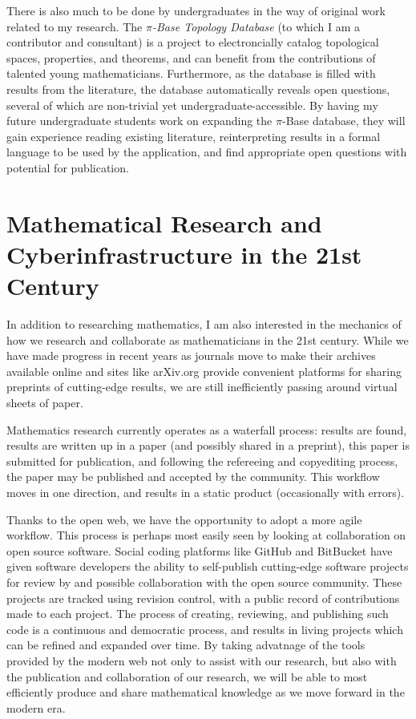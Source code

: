 \documentclass[11pt]{amsart}
\theoremstyle{plain}
\newcommand{\<}{\langle}
\renewcommand{\>}{\rangle}
\begin{document}
There is also much to be done by undergraduates in the way of original work
related to my research. The \textit{$\pi$-Base Topology Database}
(to which I am a contributor and consultant) is a project to electroncially
catalog topological spaces, properties, and theorems, and
can benefit from the contributions of talented young mathematicians.
Furthermore, as the database is filled with results from the literature,
the database automatically reveals open questions, several of which
are non-trivial yet undergraduate-accessible. By having my future
undergraduate students
work on expanding the $\pi$-Base database, they will gain experience reading
existing literature, reinterpreting results in a formal language to be
used by the application, and find appropriate open questions with potential
for publication.


\section*{Mathematical Research and Cyberinfrastructure in the 21st Century}

In addition to researching mathematics, I am also interested in the mechanics
of how we research and collaborate as mathematicians in the 21st century.
While we have made progress in recent years as journals move to make their
archives available online and sites like arXiv.org provide convenient platforms
for sharing preprints of cutting-edge results, we are still
inefficiently passing around virtual sheets of paper.

Mathematics research currently operates as a waterfall process: results
are found, results are written up in a paper (and possibly shared in a
preprint), this paper is submitted for publication, and following the refereeing
and copyediting process, the paper may be published and accepted by the
community. This workflow moves in one direction, and results in a static
product (occasionally with errors).

Thanks to the open web, we have the opportunity to adopt a more agile
workflow. This process is perhaps most
easily seen by looking at collaboration on open source software.
Social coding platforms like GitHub and BitBucket have given software
developers the ability to self-publish cutting-edge software projects for
review by and possible collaboration with the open source community. These
projects are tracked using revision control, with a public record of
contributions made to each project. The process of creating, reviewing, and
publishing such code is a continuous and democratic process, and results
in living projects which can be refined and expanded over time.
By taking advatnage of the tools provided
by the modern web not only to assist with our research, but also with
the publication and collaboration of our research, we will be able to most
efficiently produce and share mathematical knowledge as we move forward in
the modern era.
\end{document}
